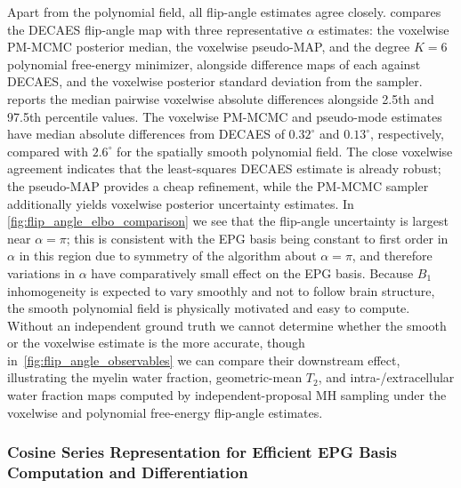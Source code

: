 Apart from the polynomial field, all flip-angle estimates agree closely.
 compares the \gls*{DECAES} flip-angle map with three representative $\alpha$ estimates:
the voxelwise PM-\gls*{MCMC} posterior median, the voxelwise pseudo-\gls*{MAP}, and the degree $K = 6$ polynomial free-energy minimizer, alongside difference maps of each against \gls*{DECAES}, and the voxelwise posterior standard deviation from the sampler.
 reports the median pairwise voxelwise absolute differences alongside 2.5th and 97.5th percentile values.
The voxelwise PM-\gls*{MCMC} and pseudo-mode estimates have median absolute differences from \gls*{DECAES} of $0.32^\circ$ and $0.13^\circ$, respectively, compared with $2.6^\circ$ for the spatially smooth polynomial field.
The close voxelwise agreement indicates that the least-squares \gls*{DECAES} estimate is already robust;
the pseudo-\gls*{MAP} provides a cheap refinement, while the PM-\gls*{MCMC} sampler additionally yields voxelwise posterior uncertainty estimates.
In \cref{fig:flip_angle_elbo_comparison} we see that the flip-angle uncertainty is largest near $\alpha = \pi$;
this is consistent with the \gls*{EPG} basis being constant to first order in $\alpha$ in this region due to symmetry of the algorithm about $\alpha = \pi$, and therefore variations in $\alpha$ have comparatively small effect on the \gls*{EPG} basis.
Because $B_1$ inhomogeneity is expected to vary smoothly and not to follow brain structure, the smooth polynomial field is physically motivated and easy to compute.
Without an independent ground truth we cannot determine whether the smooth or the voxelwise estimate is the more accurate, though in~\cref{fig:flip_angle_observables} we can compare their downstream effect, illustrating the myelin water fraction, geometric-mean $T_2$, and intra-/extracellular water fraction maps computed by independent-proposal \gls*{MH} sampling under the voxelwise and polynomial free-energy flip-angle estimates.

\subsubsection{Cosine Series Representation for Efficient \gls*{EPG} Basis Computation and Differentiation}

